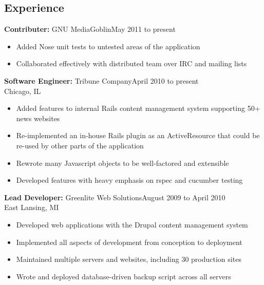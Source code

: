 \documentclass[]{res}
\begin{document}


\begin{resume}


\section{Experience}
{\bf Contributer:} GNU MediaGoblin\dotfill May 2011 to present
\begin{itemize}
\item Added Nose unit tests to untested areas of the application
\item Collaborated effectively with distributed team over IRC and mailing lists
\end{itemize}

{\bf Software Engineer:} Tribune Company\dotfill April 2010 to present\\
Chicago, IL
\begin{itemize}
\item Added features to internal Rails content management system
      supporting 50\footnotesize{+} \normalsize news websites
\item Re-implemented an in-house Rails plugin as an ActiveResource that could
      be re-used by other parts of the application
\item Rewrote many Javascript objects to be well-factored and extensible
\item Developed features with heavy emphasis on rspec and cucumber testing
\end{itemize}

{\bf Lead Developer:} Greenlite Web Solutions\dotfill August 2009 to April 2010\\
East Lansing, MI
\begin{itemize}
\item Developed web applications with the Drupal content management system
\item Implemented all aspects of development from conception to deployment
\item Maintained multiple servers and websites, including 30 production sites
\item Wrote and deployed database-driven backup script across all servers
\end{itemize}


\end{resume}
\end{document}
